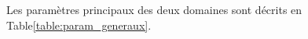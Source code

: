 \documentclass[10pt,a4paper,titlepage]{article}
\begin{document}
Les paramètres principaux des deux domaines sont décrits en Table\ref{table:param_generaux}.

\end{document}
